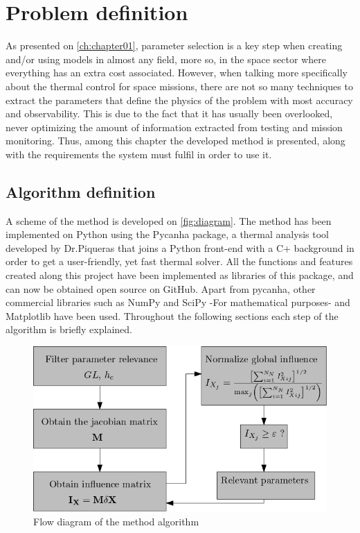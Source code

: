 \chapter{Problem definition}\label{ch:chapter02}
As presented on \autoref{ch:chapter01}, parameter selection is a key step when creating and/or using models in almost any field, more so, in the space sector where everything has an extra cost associated. However, when talking more specifically about the thermal control for space missions, there are not so many techniques to extract the parameters that define the physics of the problem with most accuracy and observability. This is due to the fact that it has usually been overlooked, never optimizing the amount of information extracted from testing and mission monitoring. Thus, among this chapter the developed method is presented, along with the requirements the system must fulfil in order to use it.

\section{Algorithm definition}
A scheme of the method is developed on \autoref{fig:diagram}. The method has been implemented on Python \cite{python} using the Pycanha package, a thermal analysis tool developed by Dr.Piqueras that joins a Python front-end with a C+ background in order to get a user-friendly, yet fast thermal solver. All the functions and features created along this project have been implemented as libraries of this package, and can now be obtained open source on GitHub. Apart from pycanha, other commercial libraries such as NumPy \cite{numpy} and SciPy \cite{scipy} -For mathematical purposes- and Matplotlib \cite{matplotlib} have been used. Throughout the following sections each step of the algorithm is briefly explained.

\begin{figure}[H]
    \centering
    \includegraphics[width=\textwidth]{Figures/influence_diagram.png}
    \caption{Flow diagram of the method algorithm}
    \label{fig:diagram}
\end{figure}

